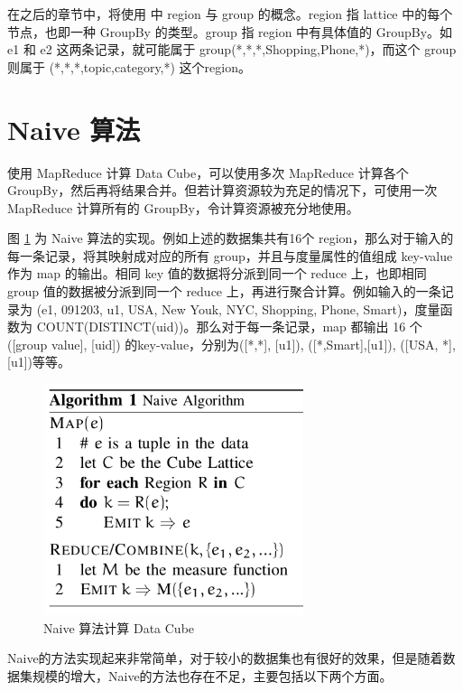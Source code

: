 在之后的章节中，将使用 \cite{nandi2011distributed} 中 region 与 group 的概念。region 指 lattice 中的每个节点，也即一种 GroupBy 的类型。group 指 region 中有具体值的 GroupBy。如 e1 和 e2 这两条记录，就可能属于 group(*,*,*,Shopping,Phone,*)，而这个 group 则属于 (*,*,*,topic,category,*) 这个region。

\section{Naive 算法}

使用 MapReduce 计算 Data Cube，可以使用多次 MapReduce 计算各个 GroupBy，然后再将结果合并。但若计算资源较为充足的情况下，可使用一次 MapReduce 计算所有的 GroupBy，令计算资源被充分地使用。

图 \ref{naive_cube} 为 Naive 算法的实现。例如上述的数据集共有16个 region，那么对于输入的每一条记录，将其映射成对应的所有 group，并且与度量属性的值组成 key-value 作为 map 的输出。相同 key 值的数据将分派到同一个 reduce 上，也即相同 group 值的数据被分派到同一个 reduce 上，再进行聚合计算。例如输入的一条记录为 (e1, 091203, u1, USA, New Youk, NYC, Shopping, Phone, Smart)，度量函数为 COUNT(DISTINCT(uid))。那么对于每一条记录，map 都输出 16 个 ([group value], [uid]) 的key-value，分别为([*,*], [u1]), ([*,Smart],[u1]), ([USA, *], [u1])等等。

\begin{figure}[!htb]
\centering\includegraphics[width=3in]{picture/ch_datacube_mr/naive_cube} 
\caption{Naive 算法计算 Data Cube}\label{naive_cube} 
\end{figure} 

Naive的方法实现起来非常简单，对于较小的数据集也有很好的效果，但是随着数据集规模的增大，Naive的方法也存在不足，主要包括以下两个方面。

